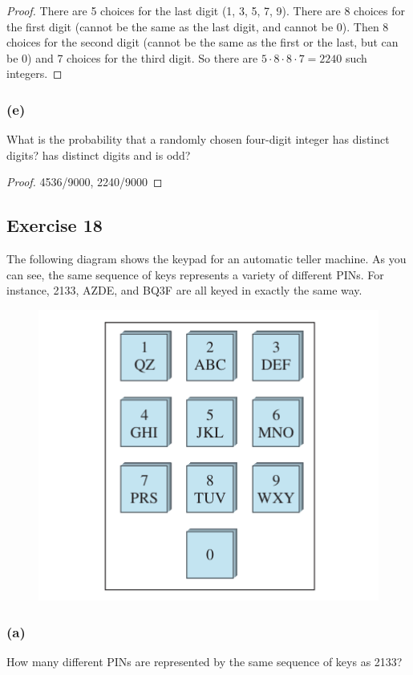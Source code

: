 \documentclass[14pt]{extarticle}
\begin{document}
\begin{proof}
There are 5 choices for the last digit (1, 3, 5, 7, 9). There are 8 choices for the first digit (cannot be the 
same as the last digit, and cannot be 0). Then 8 choices for the second digit (cannot be the same as the first or 
the last, but can be 0) and 7 choices for the third digit. So there are \(5 \cdot 8 \cdot 8 \cdot 7 = 2240\) such 
integers.
\end{proof}

\subsubsection{(e)}
What is the probability that a randomly chosen four-digit integer has distinct digits? has distinct digits and is odd?

\begin{proof}
4536/9000, 2240/9000
\end{proof}

\subsection{Exercise 18}
The following diagram shows the keypad for an automatic teller machine. As you can see, the same sequence of keys 
represents a variety of different PINs. For instance, 2133, AZDE, and BQ3F are all keyed in exactly the same way.

\begin{figure}[ht!]
\centering
\includegraphics[scale=0.5]{../images/9.2.18.png}
\end{figure}

\subsubsection{(a)}
How many different PINs are represented by the same sequence of keys as 2133?
\end{document}
